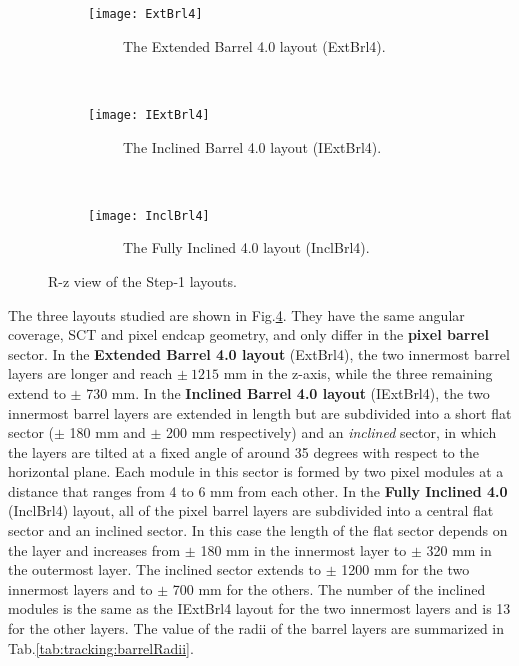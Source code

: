 \documentclass[a4paper,twoside,12pt]{book}
\begin{document}
\begin{figure}
\captionsetup[subfigure]{justification=centering}
\begin{subfigure}{\linewidth}
\centering
\texttt{[image: ExtBrl4]}
\caption{\ \ \ \ \ The Extended Barrel 4.0 layout (ExtBrl4).}
\label{fig:tracking:ExtBrl4}
\end{subfigure}\\[1ex]
\begin{subfigure}{\linewidth}
\centering
\texttt{[image: IExtBrl4]}
\caption{\ \ \ \ \ The Inclined Barrel 4.0 layout (IExtBrl4).}
\label{fig:tracking:IExtBrl4}
\end{subfigure}\\[1ex]
\begin{subfigure}{\linewidth}
\centering
\texttt{[image: InclBrl4]}
\caption{\ \ \ \ \ The Fully Inclined 4.0 layout (InclBrl4).}
\label{fig:tracking:InclBrl4}
\end{subfigure}
\caption{R-z view of the Step-1 layouts.}
\label{fig:tracking:layouts}
\end{figure}


The three layouts studied are shown in Fig.\ref{fig:tracking:layouts}. They have the same angular coverage, SCT and pixel endcap geometry, and only differ in the \textbf{pixel barrel} sector.
In the \textbf{Extended Barrel 4.0 layout} (ExtBrl4), the two innermost barrel layers are longer and
reach $\pm\ 1215$ mm in the z-axis, while the three remaining extend to $\pm$ 730 mm.
In the \textbf{Inclined Barrel 4.0 layout} (IExtBrl4), the two innermost barrel layers
are extended in length but are subdivided into a short flat sector ($\pm$ 180 mm and $\pm$ 200 mm respectively) and 
 an \textit{inclined} sector, in which the layers are tilted at a fixed angle of around 35 degrees with respect to the horizontal plane.
Each module in this sector is formed by two pixel modules at a distance that ranges from 4 to 6 mm from each other. In the \textbf{Fully Inclined 4.0} (InclBrl4) layout,
all of the pixel barrel layers are subdivided into a central flat sector and an inclined sector. In this case the length of the flat sector depends
on the layer and increases from $\pm$ 180 mm in the innermost layer to $\pm$ 320 mm in the outermost layer. The inclined sector extends
to $\pm$ 1200 mm for the two innermost layers and to $\pm$ 700 mm for the others. The number of the inclined modules is the same as the IExtBrl4 layout for the two innermost
layers and is 13 for the other layers. The value of the radii of the barrel layers are summarized in 
Tab.\ref{tab:tracking:barrelRadii}. \\
\end{document}
